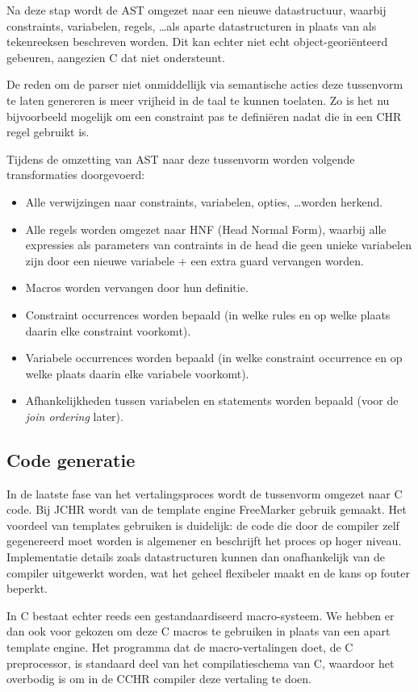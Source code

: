 Na deze stap wordt de AST omgezet naar een nieuwe datastructuur, waarbij constraints, variabelen, regels, \ldots als aparte datastructuren in plaats van als tekenreeksen beschreven worden. Dit kan echter niet echt object-geori\"enteerd gebeuren, aangezien C dat niet ondersteunt.

De reden om de parser niet onmiddellijk via semantische acties deze tussenvorm te laten genereren is meer vrijheid in de taal te kunnen toelaten. Zo is het nu bijvoorbeeld mogelijk om een constraint pas te defini\"eren nadat die in een CHR regel gebruikt is.

Tijdens de omzetting van AST naar deze tussenvorm worden volgende transformaties doorgevoerd: \begin{itemize}
\item Alle verwijzingen naar constraints, variabelen, opties, \ldots worden herkend.
\item Alle regels worden omgezet naar HNF (Head Normal Form), waarbij alle expressies als parameters van contraints in de head die geen unieke variabelen zijn door een nieuwe variabele + een extra guard vervangen worden.
\item Macros worden vervangen door hun definitie.
\item Constraint occurrences worden bepaald (in welke rules en op welke plaats daarin elke constraint voorkomt).
\item Variabele occurrences worden bepaald (in welke constraint occurrence en op welke plaats daarin elke variabele voorkomt).
\item Afhankelijkheden tussen variabelen en statements worden bepaald (voor de {\em join ordering} later).
\end{itemize}

\subsection{Code generatie}

In de laatste fase van het vertalingsproces wordt de tussenvorm omgezet naar C code. Bij JCHR wordt van de template engine FreeMarker gebruik gemaakt. Het voordeel van templates gebruiken is duidelijk: de code die door de compiler zelf gegenereerd moet worden is algemener en beschrijft het proces op hoger niveau. Implementatie details zoals datastructuren kunnen dan onafhankelijk van de compiler uitgewerkt worden, wat het geheel flexibeler maakt en de kans op fouter beperkt.

In C bestaat echter reeds een gestandaardiseerd macro-systeem. We hebben er dan ook voor gekozen om deze C macros te gebruiken in plaats van een apart template engine. Het programma dat de macro-vertalingen doet, de C preprocessor, is standaard deel van het compilatieschema van C, waardoor het overbodig is om in de CCHR compiler deze vertaling te doen.

